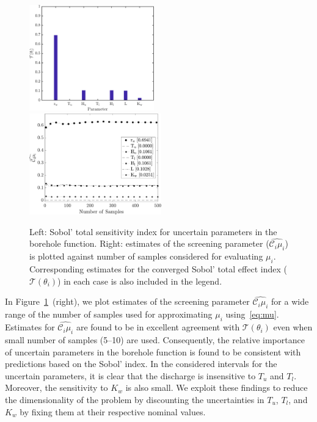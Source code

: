\begin{figure}[htbp]
 \begin{center}
  \includegraphics[width=0.48\textwidth]{./Figures/sense_borehole}
  \includegraphics[width=0.51\textwidth]{./Figures/ub_conv_borehole}
\caption{
Left: Sobol' total sensitivity index for uncertain parameters in the borehole
function. Right: 
estimates of the screening parameter ($\widehat{\mathcal{C}_i\mu_i}$) is plotted
against number of samples considered for evaluating $\mu_i$. Corresponding estimates
for the converged Sobol' total effect index ($\mathcal{T}(\theta_i)$) in each case is also included in the
legend. }
\label{fig:sense_bore}
\end{center}
\end{figure}
In Figure~\ref{fig:sense_bore}~(right), we plot estimates of the screening parameter 
$\widehat{\mathcal{C}_i\mu_i}$ for a wide range of the number of 
samples used for approximating $\mu_i$ using~\eqref{eq:mu}.
Estimates for $\widehat{\mathcal{C}_i\mu_i}$ are found to be in excellent agreement
with $\mathcal{T}(\theta_i)$ even when small number of samples (5--10) are used. 
Consequently, the relative importance of uncertain 
parameters in the borehole function is found to be consistent 
with predictions based on the Sobol' index. 
In the considered intervals for the uncertain parameters, it is clear 
that the discharge is insensitive to $T_u$ and $T_l$. 
Moreover, the sensitivity to $K_w$ is also small. We exploit these findings to reduce
the dimensionality of the problem by 
discounting the uncertainties in $T_u$, $T_l$, and $K_w$ by fixing 
them at their respective nominal values. 

